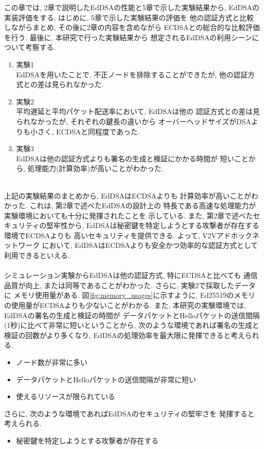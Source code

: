 この章では, 2章で説明したEdDSAの性能と5章で示した実験結果から, 
EdDSAの実装評価をする. はじめに, 5章で示した実験結果の評価を
他の認証方式と比較しながらまとめ, その後に2章の内容を含めながら
ECDSAとの総合的な比較評価を行う. 最後に, 本研究で行った実験結果から
想定されるEdDSAの利用シーンについて考察する.\\[1em]
\begin{enumerate}
  \item 実験1\\
  \indent EdDSAを用いたことで, 不正ノードを排除することができたが, 
  他の認証方式との差は見られなかった. 
  \item 実験2\\
  \indent 平均遅延と平均パケット配送率において, EdDSAは他の
  認証方式との差は見られなかったが, それぞれの鍵長の違いから
  オーバーヘッドサイズがDSAよりも小さく, ECDSAと同程度であった.
  \item 実験3\\
  \indent EdDSAは他の認証方式よりも署名の生成と検証にかかる時間が
  短いことから, 処理能力(計算効率)が高いことがわかった.
\end{enumerate}

\\
\indent 上記の実験結果のまとめから, EdDSAはECDSAよりも
計算効率が高いことがわかった. これは, 第2章で述べたEdDSAの設計上の
特長である高速な処理能力が実験環境においても十分に発揮されたことを
示している. また, 第2章で述べたセキュリティの堅牢性から, 
EdDSAは秘密鍵を特定しようとする攻撃者が存在する環境でECDSAよりも
高いセキュリティを提供できる. よって, V2Vアドホックネットワーク
において, EdDSAはECDSAよりも安全かつ効率的な認証方式として
利用できるといえる.\\

\\
\indent シミュレーション実験からEdDSAは他の認証方式, 特にECDSAと比べても
通信品質が向上, または同等であることがわかった. さらに, 実験2で採取したデータに
メモリ使用量がある. 図\ref{fig:memory_usages}に示すように,   
Ed25519のメモリの使用量がECDSAよりも少ないことがわかる. 
また, 本研究の実験環境では, EdDSAの署名の生成と検証の時間が
データパケットとHelloパケットの送信間隔(1秒)に比べて非常に短いということから, 
次のような環境であれば署名の生成と検証の回数がより多くなり, 
EdDSAの処理効率を最大限に発揮できると考えられる. 
\begin{itemize}
  \item ノード数が非常に多い
  \item データパケットとHelloパケットの送信間隔が非常に短い
  \item 使えるリソースが限られている
\end{itemize}
さらに, 次のような環境であればEdDSAのセキュリティの堅牢さを
発揮すると考えられる. 
\begin{itemize}
  \item 秘密鍵を特定しようとする攻撃者が存在する
\end{itemize} 

